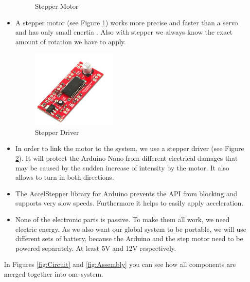 \documentclass{sigchi}
\begin{document}
\begin{itemize}
\begin{figure}
	\caption{Stepper Motor}
	\label{fig:Stepper}
\end{figure} 
\item A stepper motor (see Figure \ref{fig:Stepper}) works more precise and faster than a servo and has only small enertia \cite{steppervsservo}. Also with stepper we always know the exact amount of rotation we have to apply.
\begin{figure}
	\includegraphics[width=0.4\textwidth]{driver.png}
	\caption{Stepper Driver}
	\label{fig:Driver}
\end{figure} 
\item In order to link the motor to the system, we use a stepper driver (see Figure \ref{fig:Driver}). It will protect the Arduino Nano from different electrical damages that may be caused by the sudden increase of intensity by the motor. It also allows to turn in both directions.
\item The AccelStepper library for Arduino prevents the API from blocking and supports very slow speeds. Furthermore it helps to easily apply acceleration.
\item None of the electronic parts is passive. To make them all work, we need electric energy. As we also want our global system to be portable, we will use different sets of battery, because the Arduino and the step motor need to be powered separately. At least 5V and 12V respectively.
\end{itemize}
In Figures \ref{fig:Circuit} and \ref{fig:Assembly} you can see how all components are merged together into one system.
\end{document}
